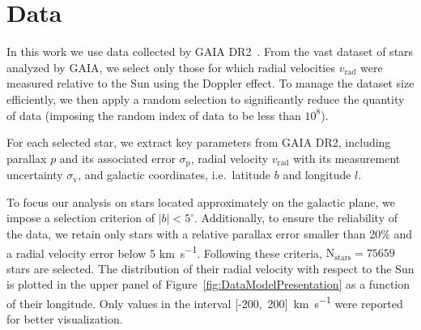 \section{Data}

In this work we use data collected by GAIA DR2~\cite{GAIADR2}. 
From the vast dataset of stars analyzed by GAIA, we select only those 
for which radial velocities $v_{\text{rad}}$ were measured relative to the Sun using the Doppler effect. 
To manage the dataset size efficiently, we then apply a random selection to significantly reduce the quantity of data 
(imposing the random index of data to be less than $10^8$).

For each selected star, we extract key parameters from GAIA DR2, 
including parallax $p$ and its associated error $\sigma_{\text{p}}$, 
radial velocity $v_{\text{rad}}$ with its measurement uncertainty $\sigma_{\text{v}}$, 
and galactic coordinates, i.e.\ latitude $b$ and longitude $l$.

To focus our analysis on stars located approximately on the galactic plane, we impose a selection criterion of $\vert b \vert < 5^{\circ}$. 
Additionally, to ensure the reliability of the data, we retain only stars with a relative parallax error smaller than 20$\%$ 
and a radial velocity error below 5 \unit{\kilo\meter\per\second}. 
Following these criteria, $\text{N}_{\text{stars}}=75659$ stars are selected. The distribution of their radial velocity 
with respect to the Sun is plotted in the upper panel of Figure~\ref{fig:DataModelPresentation} 
as a function of their longitude. Only values in the interval 
[-200,~200]~\unit{\kilo\meter\per\second} were reported for better visualization. 

